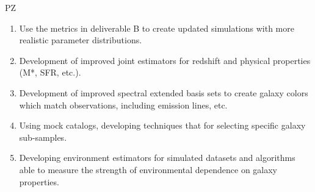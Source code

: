{\begin{tasklist}{PZ}
\begin{task}
{\begin{enumerate}
\item Use the metrics in deliverable B to create updated simulations with more realistic parameter distributions.
\item Development of improved joint estimators for redshift and physical properties (M*, SFR, etc.).
\item Development of improved spectral extended basis sets to create galaxy colors which match observations, including emission lines, etc.
\item Using mock catalogs, developing techniques that for selecting specific galaxy sub-samples.
\item Developing environment estimators for simulated datasets and algorithms able to measure the strength of environmental dependence on galaxy properties.
\end{enumerate}
}
\end{task}


\end{tasklist}}
